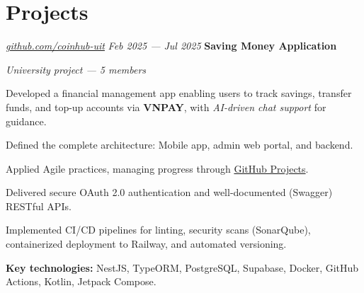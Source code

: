 \section{Projects}

\begin{twocolentry}{
		\textit{\href{https://github.com/coinhub-uit}{github.com/coinhub-uit}}
		\textit{Feb 2025 --- Jul 2025}
	}
	\textbf{Saving Money Application}

	\textit{University project — 5 members}
\end{twocolentry}

\begin{onecolentry}
	\begin{highlights}
		\item Developed a financial management app enabling users to track savings, transfer funds, and top-up
		accounts via \textbf{VNPAY}, with \textit{AI-driven chat support} for guidance.
		\item Defined the complete architecture: Mobile app, admin web portal, and backend.
		\item Applied Agile practices, managing progress through
		\href{https://github.com/orgs/coinhub-uit/projects/1}{GitHub Projects}.
		\item Delivered secure OAuth 2.0 authentication and well-documented (Swagger) RESTful APIs.
		\item Implemented CI/CD pipelines for linting, security scans (SonarQube), containerized deployment to
		Railway, and automated versioning.
		\item \textbf{Key technologies:} NestJS, TypeORM, PostgreSQL, Supabase, Docker, GitHub Actions, Kotlin,
		Jetpack Compose.
	\end{highlights}
\end{onecolentry}
